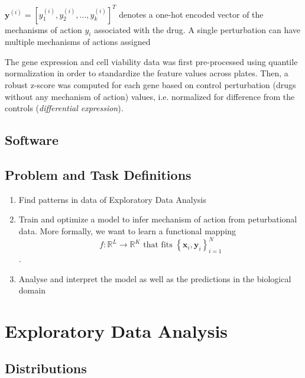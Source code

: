 \documentclass[bsc,frontabs,twoside,singlespacing,parskip,deptreport]{infthesis}     %
\let\Oldsection\section
\renewcommand{\section}{\FloatBarrier\Oldsection}
\let\Oldsubsection\subsection
\renewcommand{\subsection}{\FloatBarrier\Oldsubsection}
\begin{document}
\(\mathbf{y}^{(i)}=[y_{1}^{(i)},y_{2}^{(i)},\ldots, y_{k}^{(i)}]^{T}\) denotes a one-hot encoded vector of the mechanisms of action \(y_{i}\) associated with the drug. A single perturbation can have multiple mechanisms of actions assigned


The gene expression and cell viability data was first pre-processed using quantile normalization in order to standardize the feature values across plates. Then, a robust z-score was computed for each gene based on control perturbation (drugs without any mechanism of action) values, i.e. normalized for difference from the controls (\textit{differential expression}).

\subsection{Software}

\subsection{Problem and Task Definitions}
\begin{enumerate}
    \item Find patterns in data of Exploratory Data Analysis
    \item Train and optimize a model to infer mechanism of action from peturbational data. More formally, we want to learn a functional mapping \[f: \mathbb{R}^{L} \rightarrow \mathbb{R}^{K} \text { that fits }\left\{\mathbf{x}_{i}, \mathbf{y}_{i}\right\}_{i=1}^{N}\].
    \item Analyse and interpret the model as well as the predictions in the biological domain 
\end{enumerate}



\section{Exploratory Data Analysis}
\subsection{Distributions}\label{data distribution}
\end{document}
